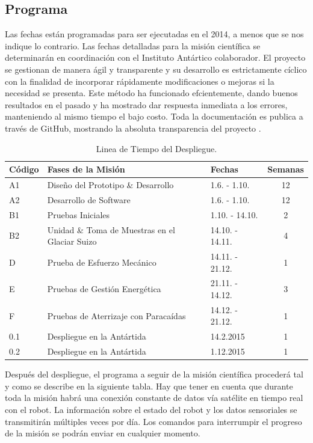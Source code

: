 \documentclass[a4paper,12pt]{article}
\begin{document}
\subsection{Programa}

Las fechas están programadas para ser ejecutadas en el 2014, a menos que se nos indique lo contrario. Las fechas detalladas para la misión científica se determinarán en coordinación con el Instituto Antártico colaborador. El proyecto se gestionan de manera ágil y transparente y su desarrollo es estrictamente cíclico con la finalidad de incorporar rápidamente modificaciones o mejoras si la necesidad se presenta. Este método ha funcionado efcientemente, dando buenos resultados en el pasado y ha mostrado dar  respuesta inmediata a los errores, manteniendo al mismo tiempo el bajo costo.
Toda la documentación es publica a través de GitHub, mostrando la absoluta transparencia del proyecto \cite{octanisgithub}. 

\begin{table}[h!]
\centering
\begin{tabular}{ l | l | l | c }

\bfseries{Código} & \bfseries{Fases de la Misión} & \bfseries{Fechas} & \bfseries{Semanas} \\
\hline
A1 & Diseño del Prototipo \& Desarrollo & 1.6. - 1.10. & 12 \\
A2 & Desarrollo de Software & 1.6. - 1.10. & 12 \\
B1 & Pruebas Iniciales & 1.10. - 14.10. & 2  \\
B2 & Unidad \& Toma de Muestras en el Glaciar Suizo & 14.10. - 14.11. & 4 \\
D & Prueba de Esfuerzo Mecánico  & 14.11. - 21.12. & 1 \\
E & Pruebas de Gestión Energética & 21.11. - 14.12. & 3 \\
F & Pruebas de Aterrizaje con Paracaídas & 14.12. - 21.12. & 1 \\
0.1 & Despliegue en la Antártida  & 14.2.2015 &  1 \\
0.2 & Despliegue en la Antártida  & 1.12.2015 &  1 \\

\end{tabular}
\caption{Linea de Tiempo del Despliegue.}
\end{table}

Después del despliegue, el programa a seguir de la misión científica procederá tal y como se describe en la siguiente tabla. Hay que tener en cuenta que durante toda la misión habrá una conexión constante de datos vía satélite en tiempo real con el robot. La información sobre el estado del robot y los datos sensoriales se transmitirán múltiples veces por día. Los comandos para interrumpir el progreso de la misión se podrán enviar en cualquier momento.
\end{document}
